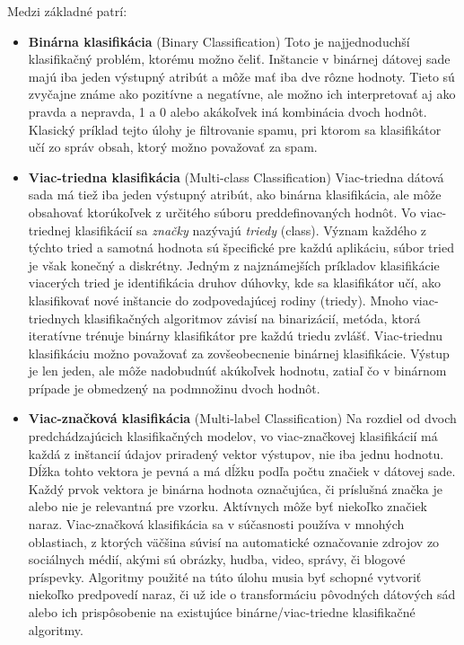 Medzi základné patrí: 
\begin{itemize}
    \item \textbf{Binárna klasifikácia} (Binary Classification) Toto je najjednoduchší klasifikačný problém, ktorému možno čeliť. Inštancie v binárnej dátovej sade majú iba jeden výstupný atribút a môže mať iba dve rôzne hodnoty. Tieto sú zvyčajne známe ako pozitívne a negatívne, ale možno ich interpretovať aj ako pravda a nepravda, 1 a 0 alebo akákoľvek iná kombinácia dvoch hodnôt. Klasický príklad tejto  úlohy je filtrovanie spamu, pri ktorom sa klasifikátor učí zo správ obsah, ktorý možno považovať za spam.
    
    \item \textbf{Viac-triedna klasifikácia} (Multi-class Classification) Viac-triedna dátová sada má tiež iba jeden výstupný atribút, ako binárna klasifikácia, ale môže obsahovať ktorúkoľvek z určitého súboru preddefinovaných hodnôt. Vo viac-triednej klasifikácií sa \textit{značky} nazývajú \textit{triedy} (class). Význam každého z týchto tried a samotná hodnota sú špecifické pre každú aplikáciu, súbor tried je však konečný a diskrétny. Jedným z najznámejších príkladov klasifikácie viacerých tried je identifikácia druhov dúhovky, kde sa klasifikátor učí, ako klasifikovať nové inštancie do zodpovedajúcej rodiny (triedy). Mnoho viac-triednych klasifikačných algoritmov závisí na binarizácií, metóda, ktorá iteratívne trénuje binárny klasifikátor pre každú triedu zvlášť. Viac-triednu klasifikáciu možno považovať za zovšeobecnenie binárnej klasifikácie. Výstup je len jeden, ale môže nadobudnúť akúkoľvek hodnotu, zatiaľ čo v binárnom prípade je obmedzený na podmnožinu dvoch hodnôt.
    
    \item \textbf{Viac-značková klasifikácia} (Multi-label Classification) Na rozdiel od dvoch predchádzajúcich klasifikačných modelov, vo viac-značkovej klasifikácií má každá z inštancií údajov priradený vektor výstupov, nie iba jednu hodnotu. Dĺžka tohto vektora je pevná a má dĺžku podľa počtu značiek v dátovej sade. Každý prvok vektora je binárna hodnota označujúca, či príslušná značka je alebo nie je relevantná pre vzorku. Aktívnych môže byť niekoľko značiek naraz. Viac-značková klasifikácia sa v súčasnosti používa v mnohých oblastiach, z ktorých väčšina súvisí na automatické označovanie zdrojov zo sociálnych médií, akými sú obrázky, hudba, video, správy, či blogové príspevky. Algoritmy použité na túto úlohu musia byť schopné vytvoriť niekoľko predpovedí naraz, či už ide o transformáciu pôvodných dátových sád alebo ich prispôsobenie na existujúce binárne/viac-triedne klasifikačné algoritmy.
\end{itemize}


